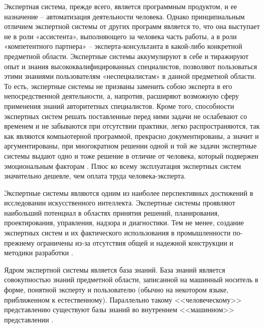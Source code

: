 Экспертная система, прежде всего, является программным продуктом, и ее назначение – автоматизация деятельности человека. Однако принципиальным отличием экспертной системы  от других программ является то, что она выступает не в роли «ассистента», выполняющего за человека часть работы, а в роли «компетентного партнера» – эксперта-консультанта в какой-либо конкретной предметной области. Экспертные системы аккумулируют в себе и тиражируют опыт и знания высококвалифицированных специалистов, позволяют пользоваться этими знаниями пользователям «неспециалистам» в данной предметной области. То есть, экспертные системы не призваны заменить собою эксперта в его непосредственной деятельности, а, напротив, расширяют возможную сферу применения знаний авторитетных специалистов. Кроме того, способности экспертных систем решать поставленные перед ними задачи не ослабевают со временем и не забываются при отсутствии практики, легко распространяются, так как являются компьютерной программой, прекрасно документированы, а значит и аргументированы, при многократном решении одной и той же задачи экспертные системы выдают одно и тоже решение в отличие от человека, который подвержен эмоциональным факторам \cite{mur2005intro}. Плюс ко всему эксплуатация экспертных систем значительно дешевле, чем оплата труда человека-эксперта. 

Экспертные системы являются одним из наиболее перспективных достижений в исследовании искусственного интеллекта. Экспертные системы проявляют наибольший потенциал в областях принятия решений, планирования, проектирования, управления, надзора и диагностики. Тем не менее, создание экспертных систем и их фактического использования в промышленности по-прежнему ограничены из-за отсутствия общей и надежной конструкции и методики разработки \cite{tasso2014topics}.

Ядром экспертной системы является база знаний. База знаний является совокупностью  знаний предметной области, записанной на машинный носитель в форме, понятной эксперту и пользователю (обычно на некотором языке, приближенном к естественному). Параллельно такому <<человеческому>> представлению существуют базы знаний во внутреннем <<машинном>> представлении \cite{gavrilova2000db}.

